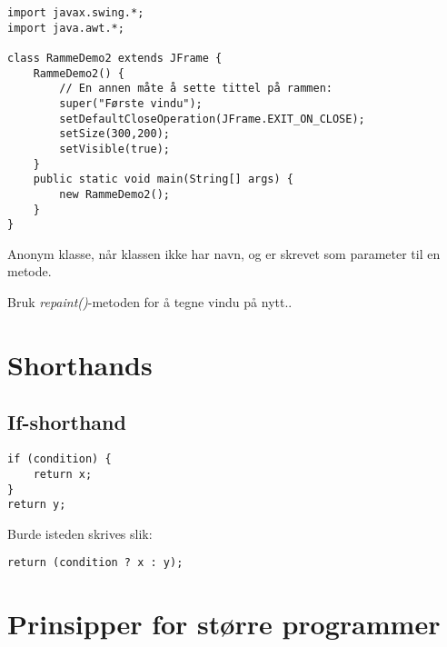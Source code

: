 \documentclass[a4paper,norsk,10pt]{article}
\begin{document}
\begin{verbatim}
import javax.swing.*; 
import java.awt.*;

class RammeDemo2 extends JFrame { 
    RammeDemo2() {
        // En annen måte å sette tittel på rammen:
        super("Første vindu");                     
        setDefaultCloseOperation(JFrame.EXIT_ON_CLOSE);
        setSize(300,200);        
        setVisible(true);
    } 
    public static void main(String[] args) {
        new RammeDemo2();
    }
}
\end{verbatim}

Anonym klasse, når klassen ikke har navn, og er skrevet som parameter
til en metode.

Bruk \emph{repaint()}-metoden for å tegne vindu på nytt..
\section{Shorthands}
\label{sec-23}
\subsection{If-shorthand}
\label{sec-23.1}


\begin{verbatim}
if (condition) {
    return x;
}
return y;
\end{verbatim}

Burde isteden skrives slik:

\begin{verbatim}
return (condition ? x : y);
\end{verbatim}
\section{Prinsipper for større programmer}
\label{sec-24}
\end{document}
